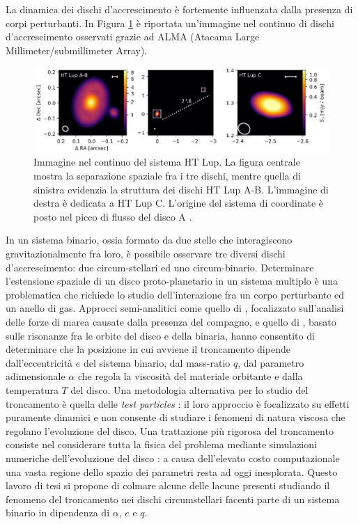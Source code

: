 La dinamica dei dischi d'accrescimento è fortemente influenzata dalla presenza di corpi perturbanti. In Figura \ref{fig:im_int} è riportata un'immagine nel continuo di dischi d'accrescimento osservati grazie ad ALMA (Atacama Large Millimeter/submillimeter Array).
\begin{figure}[H]
    \centering
    \includegraphics[width=\textwidth]{Immagini/IntroTeorica/immagine_introduzione.png}
    \caption{Immagine nel continuo del sistema HT Lup. La figura centrale mostra la separazione spaziale fra i tre dischi, mentre quella di sinistra evidenzia la struttura dei dischi HT Lup A-B. L'immagine di destra è dedicata a HT Lup C. L'origine del sistema di coordinate è posto nel picco di flusso del disco A \parencite{OsservazioniALMA}. }
    \label{fig:im_int}
\end{figure}
In un sistema binario, ossia formato da due stelle che interagiscono gravitazionalmente fra loro, è possibile osservare tre diversi dischi d'accrescimento: due circum-stellari ed uno circum-binario.
Determinare l'estensione spaziale di un disco proto-planetario in un sistema multiplo è una problematica che richiede lo studio dell'interazione fra un corpo perturbante ed un anello di gas.
Approcci semi-analitici come quello di \textcite{PapaloizouPringle1977}, focalizzato sull'analisi delle forze di marea causate dalla presenza del compagno, e quello di \textcite{GoldreichTremaine1980}, basato sulle risonanze fra le orbite del disco e della binaria, hanno consentito di determinare che la posizione in cui avviene il troncamento dipende dall'eccentricità $e$ del sistema binario, dal mass-ratio $q$, dal parametro adimensionale $\alpha$ che regola la viscosità del materiale orbitante e dalla temperatura $T$ del disco. 
Una metodologia alternativa per lo studio del troncamento è quella delle \textit{test particles} \parencite{Pichardo2005}: il loro approccio è focalizzato su effetti puramente dinamici e non consente di studiare i fenomeni di natura viscosa che regolano l'evoluzione del disco.
Una trattazione più rigorosa del troncamento consiste nel considerare tutta la fisica del problema mediante simulazioni numeriche dell'evoluzione del disco \parencite{ArtymowiczLubow1994}: a causa dell'elevato costo computazionale una vasta regione dello spazio dei parametri resta ad oggi inesplorata.
Questo lavoro di tesi si propone di colmare alcune delle lacune presenti studiando il fenomeno del troncamento nei dischi circumstellari facenti parte di un sistema binario in dipendenza di $\alpha$, $e$ e $q$. 




